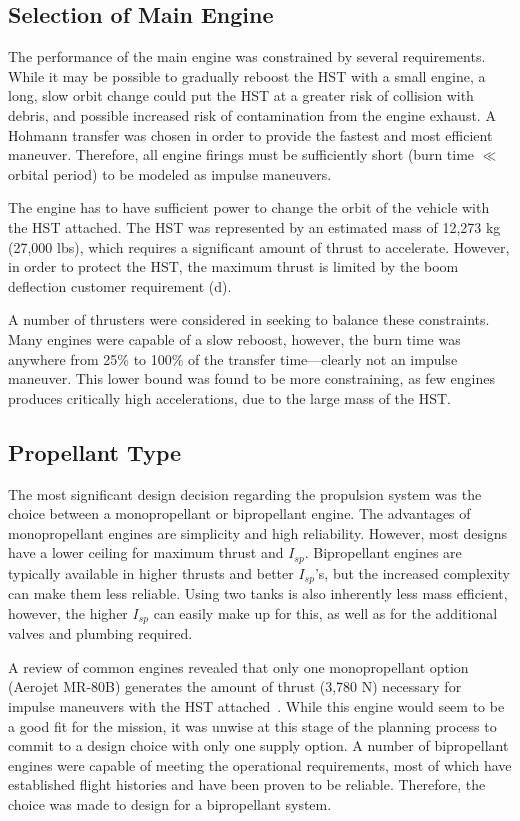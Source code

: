 \documentclass[paper=letter, fontsize=11pt]{scrartcl} %
\numberwithin{equation}{section} %
\numberwithin{figure}{section} %
\numberwithin{table}{section} %
\begin{document}
\subsection{Selection of Main Engine}
The performance of the main engine was constrained by several requirements. While it may be possible to gradually reboost the HST with a small engine, a long, slow orbit change could put the HST at a greater risk of collision with debris, and possible increased risk of contamination from the engine exhaust. A Hohmann transfer was chosen in order to provide the fastest and most efficient maneuver. Therefore, all engine firings must be sufficiently short (burn time $\ll$ orbital period) to be modeled as impulse maneuvers.

The engine has to have sufficient power to change the orbit of the vehicle with the HST attached. The HST was represented by an estimated mass of 12,273 kg (27,000 lbs), which requires a significant amount of thrust to accelerate. However, in order to protect the HST, the maximum thrust is limited by the boom deflection customer requirement (d).

A number of thrusters were considered in seeking to balance these constraints. Many engines were capable of a slow reboost, however, the burn time was anywhere from 25\% to 100\% of the transfer time---clearly not an impulse maneuver. This lower bound was found to be more constraining, as few engines produces critically high accelerations, due to the large mass of the HST.

\subsection{Propellant Type}

The most significant design decision regarding the propulsion system was the choice between a monopropellant or bipropellant engine. The advantages of monopropellant engines are simplicity and high reliability. However, most designs have a lower ceiling for maximum thrust and $I_{sp}$. Bipropellant engines are typically available in higher thrusts and better $I_{sp}$'s, but the increased complexity can make them less reliable. Using two tanks is also inherently less mass efficient, however, the higher $I_{sp}$ can easily make up for this, as well as for the additional valves and plumbing required.

A review of common engines revealed that only one monopropellant option (Aerojet MR-80B) generates the amount of thrust (3,780 N) necessary for impulse maneuvers with the HST attached~\cite{monoprop}. While this engine would seem to be a good fit for the mission, it was unwise at this stage of the planning process to commit to a design choice with only one supply option. A number of bipropellant engines were capable of meeting the operational requirements, most of which have established flight histories and have been proven to be reliable. Therefore, the choice was made to design for a bipropellant system.
\end{document}
